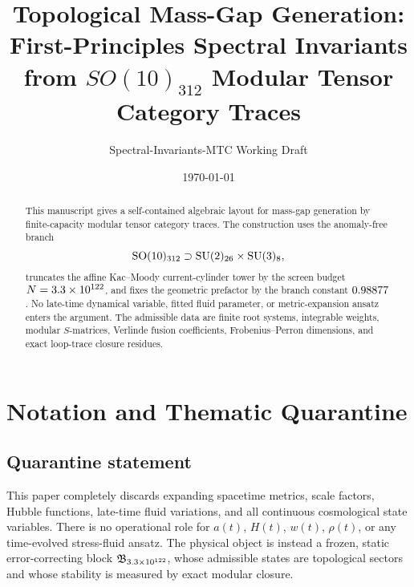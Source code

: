 \documentclass[11pt]{article}
\title{Topological Mass-Gap Generation: First-Principles Spectral Invariants from \(SO(10)_{312}\) Modular Tensor Category Traces}
\author{Spectral-Invariants-MTC Working Draft}
\date{\today}
\newcommand{\SO}{\mathrm{SO}}
\newcommand{\SU}{\mathrm{SU}}
\newcommand{\block}{\mathfrak{B}_{\modularHorizonBits}}
\begin{document}
\maketitle

\begin{abstract}
This manuscript gives a self-contained algebraic layout for mass-gap generation by finite-capacity modular tensor category traces.  The construction uses the anomaly-free branch
\[
  \SO(10)_{\benchmarkParentLevel}
  \supset
  \SU(2)_{\benchmarkLeptonLevel}\times\SU(3)_{\benchmarkQuarkLevel},
\]
truncates the affine Kac--Moody current-cylinder tower by the screen budget \(N=3.3\times10^{122}\), and fixes the geometric prefactor by the branch constant \(0.98877\).  No late-time dynamical variable, fitted fluid parameter, or metric-expansion ansatz enters the argument.  The admissible data are finite root systems, integrable weights, modular \(S\)-matrices, Verlinde fusion coefficients, Frobenius--Perron dimensions, and exact loop-trace closure residues.
\end{abstract}

\section{Notation and Thematic Quarantine}

\subsection{Quarantine statement}
This paper completely discards expanding spacetime metrics, scale factors, Hubble functions, late-time fluid variations, and all continuous cosmological state variables.  There is no operational role for \(a(t)\), \(H(t)\), \(w(t)\), \(\rho(t)\), or any time-evolved stress-fluid ansatz.  The physical object is instead a frozen, static error-correcting block \(\block\), whose admissible states are topological sectors and whose stability is measured by exact modular closure.
\end{document}
